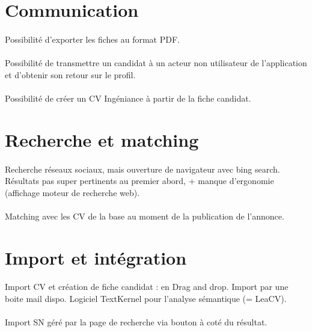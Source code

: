 \section{Communication}
\paragraph{} Possibilité d'exporter les fiches au format PDF.
\paragraph{} Possibilité de transmettre un candidat à un acteur non utilisateur de l'application et d'obtenir son retour sur le profil.
\paragraph{} Possibilité de créer un CV Ingéniance à partir de la fiche candidat.


\section{Recherche et matching}
\paragraph{} Recherche réseaux sociaux, mais ouverture de navigateur avec bing search. Résultats pas super pertinents au premier abord, + manque d'ergonomie (affichage moteur de recherche web).
\paragraph{} Matching avec les CV de la base au moment de la publication de l'annonce.



\section{Import et intégration}
\paragraph{} Import CV et création de fiche candidat : en Drag and drop. Import par une boite mail dispo. Logiciel TextKernel pour l'analyse sémantique (= LeaCV). 
\paragraph{} Import SN géré par la page de recherche via bouton à coté du résultat.


